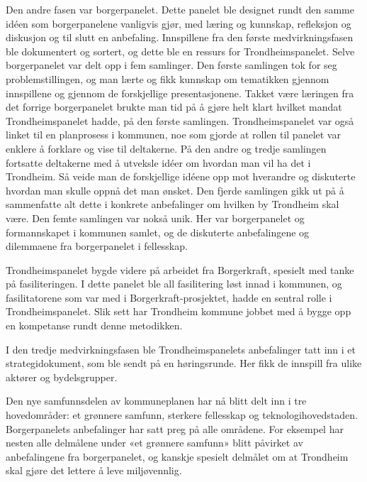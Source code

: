 \documentclass[
  12pt,
  a4paper, 12pt]{article}
\begin{document}
Den andre fasen var borgerpanelet. Dette panelet ble designet rundt den samme idéen som borgerpanelene vanligvis gjør, med læring og kunnskap, refleksjon og diskusjon og til slutt en anbefaling. Innspillene fra den første medvirkningsfasen ble dokumentert og sortert, og dette ble en ressurs for Trondheimspanelet. Selve borgerpanelet var delt opp i fem samlinger. Den første samlingen tok for seg problemstillingen, og man lærte og fikk kunnskap om tematikken gjennom innspillene og gjennom de forskjellige presentasjonene. Takket være læringen fra det forrige borgerpanelet brukte man tid på å gjøre helt klart hvilket mandat Trondheimspanelet hadde, på den første samlingen. Trondheimspanelet var også linket til en planprosess i kommunen, noe som gjorde at rollen til panelet var enklere å forklare og vise til deltakerne. På den andre og tredje samlingen fortsatte deltakerne med å utveksle idéer om hvordan man vil ha det i Trondheim. Så veide man de forskjellige idéene opp mot hverandre og diskuterte hvordan man skulle oppnå det man ønsket. Den fjerde samlingen gikk ut på å sammenfatte alt dette i konkrete anbefalinger om hvilken by Trondheim skal være. Den femte samlingen var nokså unik. Her var borgerpanelet og formannskapet i kommunen samlet, og de diskuterte anbefalingene og dilemmaene fra borgerpanelet i fellesskap.

Trondheimspanelet bygde videre på arbeidet fra Borgerkraft, spesielt med tanke på fasiliteringen. I dette panelet ble all fasilitering løst innad i kommunen, og fasilitatorene som var med i Borgerkraft-prosjektet, hadde en sentral rolle i Trondheimspanelet. Slik sett har Trondheim kommune jobbet med å bygge opp en kompetanse rundt denne metodikken.

I den tredje medvirkningsfasen ble Trondheimspanelets anbefalinger tatt inn i et strategidokument, som ble sendt på en høringsrunde. Her fikk de innspill fra ulike aktører og bydelsgrupper.

Den nye samfunnsdelen av kommuneplanen har nå blitt delt inn i tre hovedområder: et grønnere samfunn, sterkere fellesskap og teknologihovedstaden. Borgerpanelets anbefalinger har satt preg på alle områdene. For eksempel har nesten alle delmålene under «et grønnere samfunn» blitt påvirket av anbefalingene fra borgerpanelet, og kanskje spesielt delmålet om at Trondheim skal gjøre det lettere å leve miljøvennlig.
\end{document}
